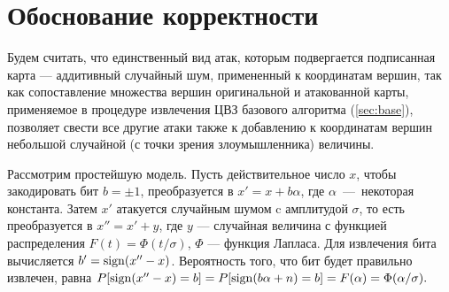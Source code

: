 \section{Обоснование корректности}
\label{sec:explanation}
Будем считать, что единственный вид атак, которым подвергается подписанная карта --- аддитивный случайный шум, примененный к координатам вершин, 
так как сопоставление множества вершин оригинальной и атакованной карты, применяемое в процедуре извлечения ЦВЗ базового алгоритма 
(\ref{sec:base}), позволяет свести все другие атаки также к добавлению к координатам вершин 
небольшой случайной (с точки зрения злоумышленника) величины.

Рассмотрим простейшую модель. Пусть действительное число $x$, чтобы закодировать бит $b = \pm 1$, преобразуется в $x' = x + b \alpha$, 
где $\alpha$~---~некоторая константа. Затем $x'$ атакуется случайным шумом c амплитудой $\sigma$, то есть преобразуется в $x'' = x' + y$,
где $y$ --- случайная величина с функцией распределения $F(t) = \Phi(t / \sigma)$, $\Phi$ --- функция Лапласа. Для извлечения бита вычисляется
$b' = \operatorname{sign}(x'' - x)$. Вероятность того, что бит будет правильно извлечен, равна 
$
P[\operatorname{sign}(x'' - x) = b] = P[\operatorname{sign}(b \alpha + n) = b] = F(\alpha) = \Phi(\alpha / \sigma).
$

